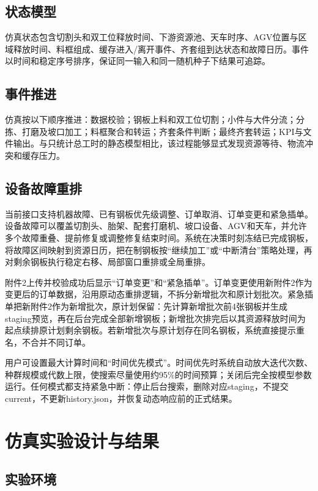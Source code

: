 \documentclass[UTF8,zihao=-4,openany]{ctexrep}
\begin{document}
\section{状态模型}

仿真状态包含切割头和双工位释放时间、下游资源池、天车时序、AGV位置与区域释放时间、料框组成、缓存进入/离开事件、齐套组到达状态和故障日历。事件以时间和稳定序号排序，保证同一输入和同一随机种子下结果可追踪。

\section{事件推进}

仿真按以下顺序推进：数据校验；钢板上料和双工位切割；小件与大件分流；分拣、打磨及坡口加工；料框聚合和转运；齐套条件判断；最终齐套转运；KPI与文件输出。与只统计总工时的静态模型相比，该过程能够显式发现资源等待、物流冲突和缓存压力。

\section{设备故障重排}

当前接口支持机器故障、已有钢板优先级调整、订单取消、订单变更和紧急插单。设备故障可以覆盖切割头、胎架、配套打磨机、坡口设备、AGV和天车，并允许多个故障重叠、提前修复或调整修复结束时间。系统在决策时刻冻结已完成钢板，将故障区间映射到资源日历，把在制钢板按“继续加工”或“中断清台”策略处理，再对剩余钢板执行稳定右移、局部窗口重排或全局重排。

附件2上传并校验成功后显示“订单变更”和“紧急插单”。订单变更使用新附件2作为变更后的订单数据，沿用原动态重排逻辑，不拆分新增批次和原计划批次。紧急插单把新附件2作为新增批次，原计划保留：先计算新增批次前4张钢板并生成staging预览，再在后台完成全部新增钢板；新增批次排完后以其资源释放时间为起点续排原计划剩余钢板。若新增批次与原计划存在同名钢板，系统直接提示重名，不合并不同订单。

用户可设置最大计算时间和“时间优先模式”。时间优先时系统自动放大迭代次数、种群规模或代数上限，使搜索尽量使用约95\%的时间预算；关闭后完全按模型参数运行。任何模式都支持紧急中断：停止后台搜索，删除对应staging，不提交current，不更新history.json，并恢复动态响应前的正式结果。

\chapter{仿真实验设计与结果}

\section{实验环境}
\end{document}
